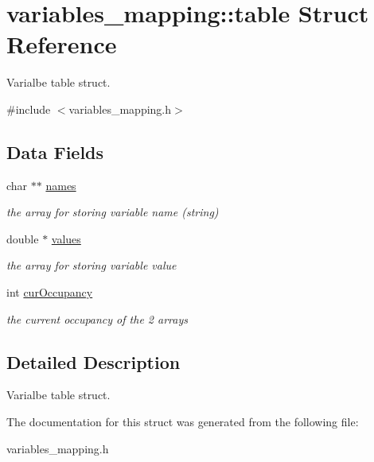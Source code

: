 \hypertarget{structvariables__mapping_1_1table}{\section{variables\-\_\-mapping\-:\-:table Struct Reference}
\label{structvariables__mapping_1_1table}
}


Varialbe table struct.  




{\ttfamily \#include $<$variables\-\_\-mapping.\-h$>$}

\subsection*{Data Fields}
\begin{DoxyCompactItemize}
\item 
\hypertarget{structvariables__mapping_1_1table_a26fc633cf551a2621e172633486c85ef}{char $\ast$$\ast$ \hyperlink{structvariables__mapping_1_1table_a26fc633cf551a2621e172633486c85ef}{names}}\label{structvariables__mapping_1_1table_a26fc633cf551a2621e172633486c85ef}

\begin{DoxyCompactList}\small\item\em the array for storing variable name (string) \end{DoxyCompactList}\item 
\hypertarget{structvariables__mapping_1_1table_a2098158062e3e63fce7d2575b324c386}{double $\ast$ \hyperlink{structvariables__mapping_1_1table_a2098158062e3e63fce7d2575b324c386}{values}}\label{structvariables__mapping_1_1table_a2098158062e3e63fce7d2575b324c386}

\begin{DoxyCompactList}\small\item\em the array for storing variable value \end{DoxyCompactList}\item 
\hypertarget{structvariables__mapping_1_1table_aef8007b712486b5acb83207b52671d1e}{int \hyperlink{structvariables__mapping_1_1table_aef8007b712486b5acb83207b52671d1e}{cur\-Occupancy}}\label{structvariables__mapping_1_1table_aef8007b712486b5acb83207b52671d1e}

\begin{DoxyCompactList}\small\item\em the current occupancy of the 2 arrays \end{DoxyCompactList}\end{DoxyCompactItemize}


\subsection{Detailed Description}
Varialbe table struct. 

The documentation for this struct was generated from the following file\-:\begin{DoxyCompactItemize}
\item 
variables\-\_\-mapping.\-h\end{DoxyCompactItemize}
